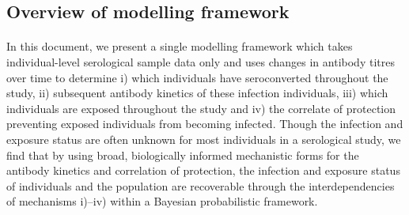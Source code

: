 \subsection{Overview of modelling framework}

\paragraph{}In this document, we present a single modelling framework which takes individual-level serological sample data only and uses changes in antibody titres over time to determine i) which individuals have seroconverted throughout the study, ii) subsequent antibody kinetics of these infection individuals, iii) which individuals are exposed throughout the study and iv) the correlate of protection preventing exposed individuals from becoming infected. Though the infection and exposure status are often unknown for most individuals in a serological study, we find that by using broad, biologically informed mechanistic forms for the antibody kinetics and correlation of protection, the infection and exposure status of individuals and the population are recoverable through the interdependencies of mechanisms i)–iv) within a Bayesian probabilistic framework. 